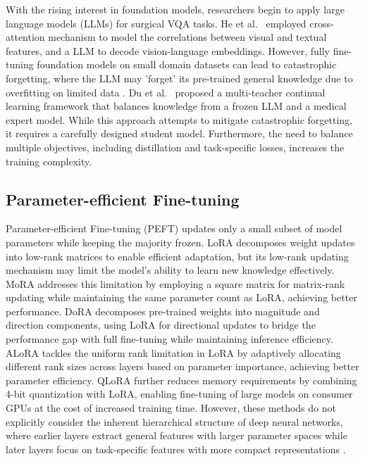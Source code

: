 With the rising interest in foundation models, researchers begin to apply large language models (LLMs) for surgical VQA tasks. He et al.~\cite{he2024pitvqa} employed cross-attention mechanism to model the correlations between visual and textual features, and a LLM to decode vision-language embeddings. However, fully fine-tuning foundation models on small domain datasets can lead to catastrophic forgetting, where the LLM may 'forget' its pre-trained general knowledge due to overfitting on limited data \cite{balne2024parameter, bafghi2025fine}. Du et al.~\cite{Du2024llm} proposed a multi-teacher continual learning framework that balances knowledge from a frozen LLM and a medical expert model. While this approach attempts to mitigate catastrophic forgetting, it requires a carefully designed student model. Furthermore, the need to balance multiple objectives, including distillation and task-specific losses, increases the training complexity.

\subsection{Parameter-efficient Fine-tuning}
Parameter-efficient Fine-tuning (PEFT) updates only a small subset of model parameters while keeping the majority frozen. LoRA\cite{hu2022lora} decomposes weight updates into low-rank matrices to enable efficient adaptation, but its low-rank updating mechanism may limit the model's ability to learn new knowledge effectively. MoRA\cite{jiang2024mora} addresses this limitation by employing a square matrix for matrix-rank updating while maintaining the same parameter count as LoRA, achieving better performance. DoRA\cite{jiang2024mora} decomposes pre-trained weights into magnitude and direction components, using LoRA for directional updates to bridge the performance gap with full fine-tuning while maintaining inference efficiency. ALoRA\cite{liu2024alora} tackles the uniform rank limitation in LoRA by adaptively allocating different rank sizes across layers based on parameter importance, achieving better parameter efficiency. QLoRA\cite{dettmers2024qlora} further reduces memory requirements by combining 4-bit quantization with LoRA, enabling fine-tuning of large models on consumer GPUs at the cost of increased training time. However, these methods do not explicitly consider the inherent hierarchical structure of deep neural networks, where earlier layers extract general features with larger parameter spaces while later layers focus on task-specific features with more compact representations \cite{xu2024correlating}.